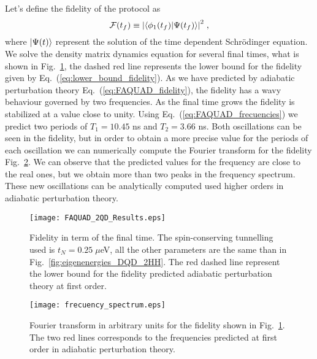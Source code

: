 Let's define the fidelity of the protocol as
\begin{equation}
	\mathcal{F}(t_f)\equiv \abs{\braket{\phi_1(t_f)}{\Psi(t_f)}}^2\; ,
\end{equation}
where $\ket{\Psi(t)}$ represent the solution of the time dependent Schrödinger equation. We solve the density matrix dynamics equation for several final times, what is shown in Fig.~\ref{fig:FAQUAD_2QD_Results}, the dashed red line represents the lower bound for the fidelity given by Eq.~(\ref{eq:lower_bound_fidelity}). As we have predicted by adiabatic perturbation theory Eq.~(\ref{eq:FAQUAD_fidelity}), the fidelity has a wavy behaviour governed by two frequencies. As the final time grows the fidelity is stabilized at a value close to unity. Using Eq.~(\ref{eq:FAQUAD_frecuencies}) we predict two periods of $T_1=10.45$ ns and $T_2=3.66$ ns. Both oscillations can be seen in the fidelity, but in order to obtain a more precise value for the periods of each oscillation we can numerically compute the Fourier transform for the fidelity Fig.~\ref{fig:frecuency_spectrum}. We can observe that the predicted values for the frequency are close to the real ones, but we obtain more than two peaks in the frequency spectrum. These new oscillations can be analytically computed used higher orders in adiabatic perturbation theory.
\begin{figure}[!htb]
	\centering
	\texttt{[image: FAQUAD\_2QD\_Results.eps]}
	\caption{Fidelity in term of the final time. The spin-conserving tunnelling used is $t_N=0.25\; \mu$eV, all the other parameters are the same than in Fig.~\ref{fig:eigenenergies_DQD_2HH}. The red dashed line represent the lower bound for the fidelity predicted adiabatic perturbation theory at first order.}
	\label{fig:FAQUAD_2QD_Results}
\end{figure}
\begin{figure}[!htb]
	\centering
	\texttt{[image: frecuency\_spectrum.eps]}
	\caption{Fourier transform in arbitrary units for the fidelity shown in Fig.~\ref{fig:FAQUAD_2QD_Results}. The two red lines corresponds to the frequencies predicted at first order in adiabatic perturbation theory.}
	\label{fig:frecuency_spectrum}
\end{figure}

